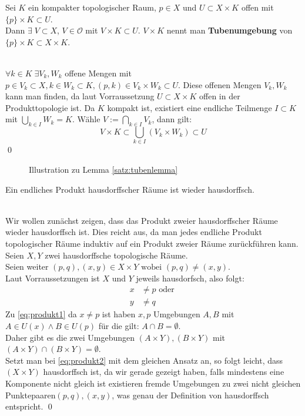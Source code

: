 \begin{Lemma}[Tubenlemma]\label{satz:tubenlemma}
	Sei \(K \) ein kompakter topologischer Raum,  \(p \in X \) und \( U \subset X \times K \) offen mit \( \{p\} \times K \subset U \). \\
	Dann \( \exists \; V \subset X \), \( V \in \mathcal{O} \) mit \( V \times K \subset U \). \( V \times K \) nennt man \textbf{Tubenumgebung} von 
	\( \{p\} \times K \subset X \times K \).
\end{Lemma} 
%
	\\
	\( \forall k \in K \; \exists V_{k}, W_{k}\) offene Mengen mit \( p \in V_{k} \subset X, k \in W_{k} \subset K, (p,k) \in  V_{k} \times W_{k} \subset U\).
	Diese offenen Mengen \(V_{k}, W_{k}\) kann man finden, da laut Vorraussetzung \(U  \subset X \times K \) offen in der Produkttopologie ist.
	Da \(K \) kompakt ist, existiert eine endliche Teilmenge
	\( I \subset K \) mit \( \bigcup_{ k \in I } W_{k} = K \). Wähle \(V := \bigcap_{ k \in I } V_{k} \), dann gilt:
	\[ V \times K \subset \bigcup_{k \in I} (V_{k} \times W_{k}) \subset U \] \qed	\\
%
\begin{figure}[ht]
	\centering
	\def\svgwidth{200}
	
	\label{fig:tubenlemma}
	\caption{Illustration zu Lemma \ref{satz:tubenlemma}}
\end{figure}
%
\begin{Satz}
	Ein endliches Produkt hausdorffscher Räume ist wieder hausdorffsch.
\end{Satz}
%
	\\
	Wir wollen zunächst zeigen, dass das Produkt zweier hausdorffscher Räume wieder hausdorffsch ist. Dies reicht aus, da man jedes endliche Produkt topologischer Räume
	induktiv auf ein Produkt zweier Räume zurückführen kann. \\
	Seien \(X, Y\) zwei hausdorffsche topologische Räume.\\
	Seien weiter \( (p,q), (x,y) \in X \times Y \mbox{ wobei } (p,q) \ne (x,y) \). \\
	Laut Vorraussetzungen ist \(X\) und \(Y\) jeweils hausdorfsch, also folgt: 
	\begin{align}
		x &\ne p \mbox{ oder }\label{eq:produkt1}\\ 
		y &\ne q\label{eq:produkt2} 
	\end{align}
	Zu \eqref{eq:produkt1} da \(x \ne p \) ist haben \(x, p \) Umgebungen \(A, B \) mit \( A \in U(x)  \land B \in U(p) \) für die gilt: \(A \cap B = \emptyset \).\\ Daher gibt es die
	zwei Umgebungen \( (A \times Y), (B \times Y) \) mit \( (A \times Y) \cap (B \times Y) = \emptyset \). \\
	Setzt man bei \eqref{eq:produkt2} mit dem gleichen Ansatz an, so folgt leicht, dass \( (X \times Y) \) hausdorffsch ist, da wir gerade gezeigt haben, falls mindestens eine Komponente
	nicht gleich ist existieren fremde Umgebungen zu zwei nicht gleichen Punktepaaren\( (p,q), (x,y) \), was genau der Definition von hausdorffsch entspricht.
\qed


